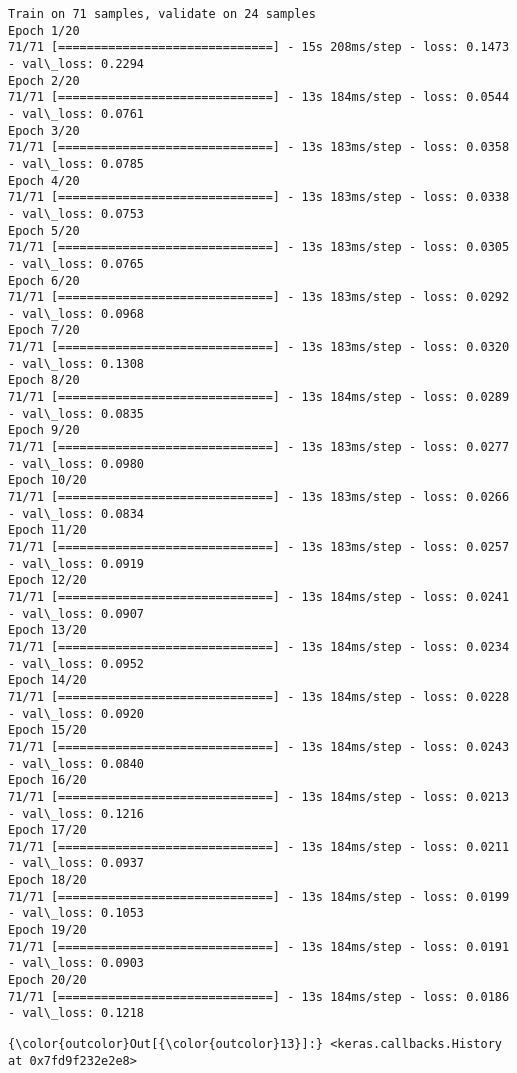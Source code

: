 \documentclass[11pt]{article}
\begin{document}
    \begin{Verbatim}[commandchars=\\\{\}]
Train on 71 samples, validate on 24 samples
Epoch 1/20
71/71 [==============================] - 15s 208ms/step - loss: 0.1473 - val\_loss: 0.2294
Epoch 2/20
71/71 [==============================] - 13s 184ms/step - loss: 0.0544 - val\_loss: 0.0761
Epoch 3/20
71/71 [==============================] - 13s 183ms/step - loss: 0.0358 - val\_loss: 0.0785
Epoch 4/20
71/71 [==============================] - 13s 183ms/step - loss: 0.0338 - val\_loss: 0.0753
Epoch 5/20
71/71 [==============================] - 13s 183ms/step - loss: 0.0305 - val\_loss: 0.0765
Epoch 6/20
71/71 [==============================] - 13s 183ms/step - loss: 0.0292 - val\_loss: 0.0968
Epoch 7/20
71/71 [==============================] - 13s 183ms/step - loss: 0.0320 - val\_loss: 0.1308
Epoch 8/20
71/71 [==============================] - 13s 184ms/step - loss: 0.0289 - val\_loss: 0.0835
Epoch 9/20
71/71 [==============================] - 13s 183ms/step - loss: 0.0277 - val\_loss: 0.0980
Epoch 10/20
71/71 [==============================] - 13s 183ms/step - loss: 0.0266 - val\_loss: 0.0834
Epoch 11/20
71/71 [==============================] - 13s 183ms/step - loss: 0.0257 - val\_loss: 0.0919
Epoch 12/20
71/71 [==============================] - 13s 184ms/step - loss: 0.0241 - val\_loss: 0.0907
Epoch 13/20
71/71 [==============================] - 13s 184ms/step - loss: 0.0234 - val\_loss: 0.0952
Epoch 14/20
71/71 [==============================] - 13s 184ms/step - loss: 0.0228 - val\_loss: 0.0920
Epoch 15/20
71/71 [==============================] - 13s 184ms/step - loss: 0.0243 - val\_loss: 0.0840
Epoch 16/20
71/71 [==============================] - 13s 184ms/step - loss: 0.0213 - val\_loss: 0.1216
Epoch 17/20
71/71 [==============================] - 13s 184ms/step - loss: 0.0211 - val\_loss: 0.0937
Epoch 18/20
71/71 [==============================] - 13s 184ms/step - loss: 0.0199 - val\_loss: 0.1053
Epoch 19/20
71/71 [==============================] - 13s 184ms/step - loss: 0.0191 - val\_loss: 0.0903
Epoch 20/20
71/71 [==============================] - 13s 184ms/step - loss: 0.0186 - val\_loss: 0.1218

    \end{Verbatim}

\begin{Verbatim}[commandchars=\\\{\}]
{\color{outcolor}Out[{\color{outcolor}13}]:} <keras.callbacks.History at 0x7fd9f232e2e8>
\end{Verbatim}
            
\end{document}

